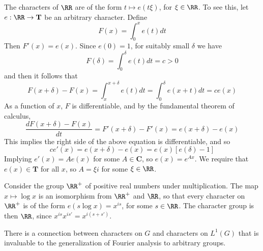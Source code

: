 \begin{example}
    The characters of $\RR$ are of the form $t \mapsto e(t\xi)$, for $\xi \in \RR$. To see this, let $e: \RR \to \mathbf{T}$ be an arbitrary character. Define
    \[ F(x) = \int_0^x e(t) dt \]
    Then $F'(x) = e(x)$. Since $e(0) = 1$, for suitably small $\delta$ we have
    \[ F(\delta) = \int_0^\delta e(t) dt = c > 0 \]
    and then it follows that
    \[ F(x + \delta) - F(x) = \int_x^{x + \delta} e(t) dt = \int_0^\delta e(x + t) dt = c e(x) \]
    As a function of $x$, $F$ is differentiable, and by the fundamental theorem of calculus,
    \[ \frac{dF(x + \delta) - F(x)}{dt} = F'(x + \delta) - F'(x) = e(x + \delta) - e(x) \]
    This implies the right side of the above equation is differentiable, and so
    \[ ce'(x) = e(x + \delta) - e(x) = e(x) [e(\delta) - 1] \]
    Implying $e'(x) = A e(x)$ for some $A \in \mathbf{C}$, so $e(x) = e^{Ax}$. We require that $e(x) \in \mathbf{T}$ for all $x$, so $A = \xi i$ for some $\xi \in \RR$.
\end{example}

\begin{example}
    Consider the group $\RR^+$ of positive real numbers under multiplication. The map $x \mapsto \log x$ is an isomorphism from $\RR^+$ and $\RR$, so that every character on $\RR^+$ is of the form $e(s \log x) = x^{is}$, for some $s \in \RR$. The character group is then $\RR$, since $x^{is} x^{is'} = x^{i(s + s')}$.
\end{example}

There is a connection between characters on $G$ and characters on $L^1(G)$ that is invaluable to the generalization of Fourier analysis to arbitrary groups.

